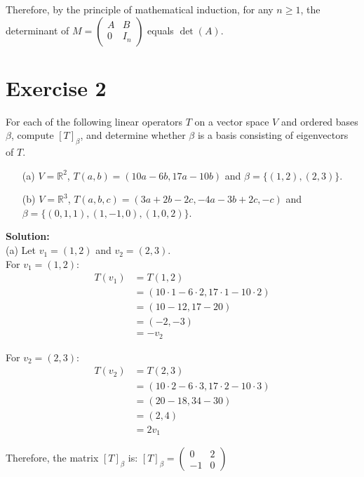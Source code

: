 \documentclass{article}
\begin{document}
Therefore, by the principle of mathematical induction, for any $n \geq 1$, the determinant of $M = \begin{pmatrix} A & B \\ 0 & I_n \end{pmatrix}$ equals $\det(A)$.

\newpage

\section*{Exercise 2}
For each of the following linear operators $T$ on a vector space $V$ and ordered bases $\beta$, compute $[T]_\beta$, and determine whether $\beta$ is a basis consisting of eigenvectors of $T$.

\begin{enumerate}
    \item[(a)] $V = \mathbb{R}^2$, $T(a,b) = (10a - 6b, 17a - 10b)$ and $\beta = \{(1,2),(2,3)\}$.
    \item[(b)] $V = \mathbb{R}^3$, $T(a,b,c) = (3a + 2b - 2c, -4a - 3b + 2c, -c)$ and $\beta = \{(0,1,1),(1,-1,0),(1,0,2)\}$.
\end{enumerate}

\textbf{Solution:} \\

(a) Let $v_1 = (1,2)$ and $v_2 = (2,3)$. \\

For $v_1 = (1,2)$:
\begin{align*}
    T(v_1) &= T(1,2) \\
    &= (10 \cdot 1 - 6 \cdot 2, 17 \cdot 1 - 10 \cdot 2) \\
    &= (10 - 12, 17 - 20) \\
    &= (-2, -3) \\
    &= -v_2
\end{align*}

For $v_2 = (2,3)$:
\begin{align*}
    T(v_2) &= T(2,3) \\
    &= (10 \cdot 2 - 6 \cdot 3, 17 \cdot 2 - 10 \cdot 3) \\
    &= (20 - 18, 34 - 30) \\
    &= (2, 4) \\
    &= 2v_1
\end{align*}

Therefore, the matrix $[T]_\beta$ is:
$[T]_\beta = \begin{pmatrix} 0 & 2 \\ -1 & 0 \end{pmatrix}$
\end{document}
